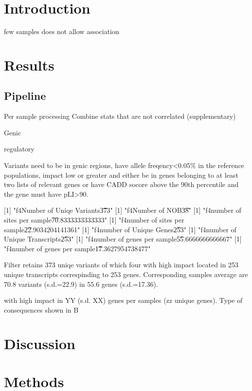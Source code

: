 \documentclass{article}
\title{} %
\author{}
\begin{document}
\maketitle

\begin{abstract}


\end{abstract}

\section{Introduction}


few samples does not allow association 



\section{Results}

\subsection{Pipeline} 


Per sample processing 
Combine stats that are not correlated (supplementary)

Genic  

regulatory 


Variants need to be in genic regions, have allele freqency<0.05\% in the reference populations, impact low or greater and either be in genes belonging to at least two lists of relevant genes or have CADD socore above the 90th percentile and the gene must have pLI>90. 

[1] "f4\tTot Number of Uniqe Variants\t373"
[1] "f4\tTot Number of NOB\t38"
[1] "f4\tAverage number of sites per sample\t70.8333333333333"
[1] "f4\tSd number of sites per sample\t22.9034204141361"
[1] "f4\tTotal number of Unique Genes\t253"
[1] "f4\tTotal number of Unique Transcripts\t253"
[1] "f4\tAverage number of genes per sample\t55.6666666666667"
[1] "f4\tSd number of genes per sample\t17.3627954738477"

Filter retains 373 uniqe variants of which four with high impact located in 253 unique transcripts correspinding to 253 genes. Corresponding samples average are 70.8 variants (s.d.=22.9) in 55.6 genes (s.d.=17.36).  


with high impact  in YY (s.d. XX) genes per samples (zz unique genes). Type of consequences shown in B 



\section{Discussion}


\section{Methods}
\end{document}

